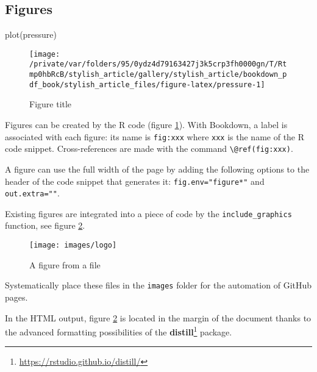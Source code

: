 \documentclass[fleqn,10pt]{latex/stylish_article} %
\newenvironment{Shaded}{\begin{snugshade}}{\end{snugshade}}
\newcommand{\FunctionTok}[1]{\textcolor[rgb]{0.00,0.00,0.00}{{#1}}}
\newcommand{\NormalTok}[1]{{#1}}
\begin{document}
\subsection{Figures}\label{figures}

\scriptsize

\begin{Shaded}
\begin{Highlighting}[]
\FunctionTok{plot}\NormalTok{(pressure)}
\end{Highlighting}
\end{Shaded}

\begin{figure}

{\centering \texttt{[image: /private/var/folders/95/0ydz4d79163427j3k5crp3fh0000gn/T/Rtmp0hbRcB/stylish\_article/gallery/stylish\_article/bookdown\_pdf\_book/stylish\_article\_files/figure-latex/pressure-1]} 

}

\caption{Figure title}\label{fig:pressure}
\end{figure}

\normalsize

Figures can be created by the R code (figure \ref{fig:pressure}).
With Bookdown, a label is associated with each figure: its name is \texttt{fig:xxx} where \texttt{xxx} is the name of the R code snippet.
Cross-references are made with the command \texttt{\textbackslash{}@ref(fig:xxx)}.

A figure can use the full width of the page by adding the following options to the header of the code snippet that generates it: \texttt{fig.env="figure*"} and \texttt{out.extra=""}.

Existing figures are integrated into a piece of code by the \texttt{include\_graphics} function, see figure \ref{fig:logo}.

\scriptsize

\begin{figure}

{\centering \texttt{[image: images/logo]} 

}

\caption{A figure from a file}\label{fig:logo}
\end{figure}

\normalsize

Systematically place these files in the \texttt{images} folder for the automation of GitHub pages.

In the HTML output, figure \ref{fig:logo} is located in the margin of the document thanks to the advanced formatting possibilities of the \textbf{distill}\footnote{\url{https://rstudio.github.io/distill/}} package.
\end{document}
